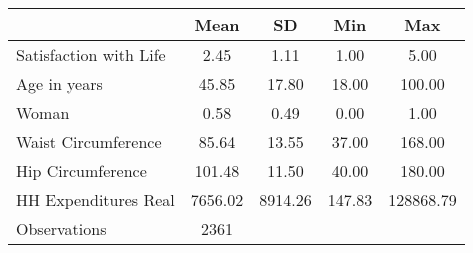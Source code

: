 {
\def\sym#1{\ifmmode^{#1}\else\(^{#1}\)\fi}
\begin{tabular}{l*{1}{cccc}}
\hline\hline
                    &        Mean&          SD&         Min&         Max\\
\hline
Satisfaction with Life&        2.45&        1.11&        1.00&        5.00\\
Age in years        &       45.85&       17.80&       18.00&      100.00\\
Woman               &        0.58&        0.49&        0.00&        1.00\\
Waist Circumference &       85.64&       13.55&       37.00&      168.00\\
Hip Circumference   &      101.48&       11.50&       40.00&      180.00\\
HH Expenditures Real&     7656.02&     8914.26&      147.83&   128868.79\\
\hline
Observations        &        2361&            &            &            \\
\hline\hline
\end{tabular}
}
